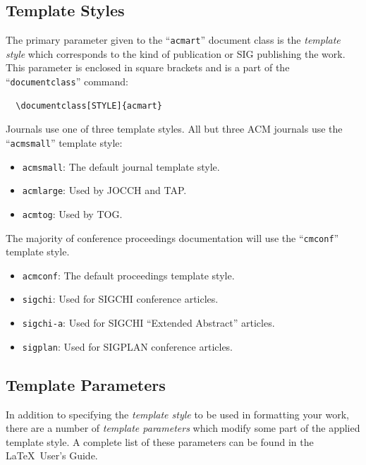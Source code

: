 \documentclass[
  letterpaper,
  DIV=11,
  numbers=noendperiod]{scrartcl}
\providecommand{\tightlist}{%
  \setlength{\itemsep}{0pt}\setlength{\parskip}{0pt}}\usepackage{longtable,booktabs,array}
\begin{document}
\hypertarget{template-styles}{%
\subsection{Template Styles}\label{template-styles}}

The primary parameter given to the ``\texttt{acmart}'' document class is
the \emph{template style} which corresponds to the kind of publication
or SIG publishing the work. This parameter is enclosed in square
brackets and is a part of the ``\texttt{documentclass}'' command:

\begin{verbatim}
  \documentclass[STYLE]{acmart}
\end{verbatim}

Journals use one of three template styles. All but three ACM journals
use the ``\texttt{acmsmall}'' template style:

\begin{itemize}
\tightlist
\item
  \texttt{acmsmall}: The default journal template style.
\item
  \texttt{acmlarge}: Used by JOCCH and TAP.
\item
  \texttt{acmtog}: Used by TOG.
\end{itemize}

The majority of conference proceedings documentation will use the
``\texttt{cmconf}'' template style.

\begin{itemize}
\tightlist
\item
  \texttt{acmconf}: The default proceedings template style.
\item
  \texttt{sigchi}: Used for SIGCHI conference articles.
\item
  \texttt{sigchi-a}: Used for SIGCHI ``Extended Abstract'' articles.
\item
  \texttt{sigplan}: Used for SIGPLAN conference articles.
\end{itemize}

\hypertarget{template-parameters}{%
\subsection{Template Parameters}\label{template-parameters}}

In addition to specifying the \emph{template style} to be used in
formatting your work, there are a number of \emph{template parameters}
which modify some part of the applied template style. A complete list of
these parameters can be found in the \LaTeX~User's Guide.
\end{document}
